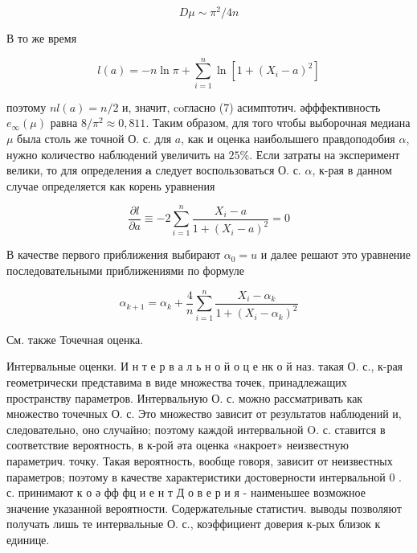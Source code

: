 \documentclass[10pt]{article}
\begin{document}
\[

D \mu \sim \pi^{2} / 4 n

\]



В то же время



\[

l(a)=-n \ln \pi+\sum_{i=1}^{n} \ln \left[1+\left(X_{i}-a\right)^{2}\right]

\]



поэтому $n l(a)=n / 2$ и, значит, coгласно (7) асимптотич. әфффективность $e_{\infty}(\mu)$ равна $8 / \pi^{2} \approx 0,811$. Таким образом, для того чтобы выборочная медиана $\mu$ была столь же точной О. с. для $a$, как и оценка наиболышего правдоподобия $\alpha$, нужно количество наблюдений увеличить на $25 \%$. Если затраты на эксперимент велики, то для определения $\boldsymbol{a}$ следует воспользоваться О. с. $\alpha$, к-рая в данном случае определяется как корень уравнения



\[

\frac{\partial l}{\partial a} \equiv-2 \sum_{i=1}^{n} \frac{X_{i}-a}{1+\left(X_{i}-a\right)^{2}}=0

\]



В качестве первого приближения выбирают $\alpha_{0}=u$ и далее решают это уравнение последовательными приближениями по формуле



\[

\alpha_{k+1}=\alpha_{k}+\frac{4}{n} \sum_{i=1}^{n} \frac{X_{i}-\alpha_{k}}{1+\left(X_{i}-\alpha_{k}\right)^{2}}

\]



См. также Точечная оценка.



Интервальные оценки. И н т е р в а л ь н о й о ц е нк о й наз. такая О. с., к-рая геометрически представима в виде множества точек, принадлежащих пространству параметров. Интервальную О. с. можно рассматривать как множество точечных О. с. Это множество зависит от результатов наблюдений и, следовательно, оно случайно; поэтому каждой интервальной $\mathrm{O}$. с. ставится в соответствие вероятность, в к-рой әта оценка «накроет» неизвестную параметрич. точку. Такая вероятность, вообще говоря, зависит от неизвестных параметров; поэтому в качестве характеристики достоверности интервальной 0 . с. принимают к о ә фф фц и е н т Д о в е р и я - наименьшее возможное значение указанной вероятности. Содержательные статистич. выводы позволяют получать лишь те интервальные О. с., коэффициент доверия к-рых близок к единице.
\end{document}
